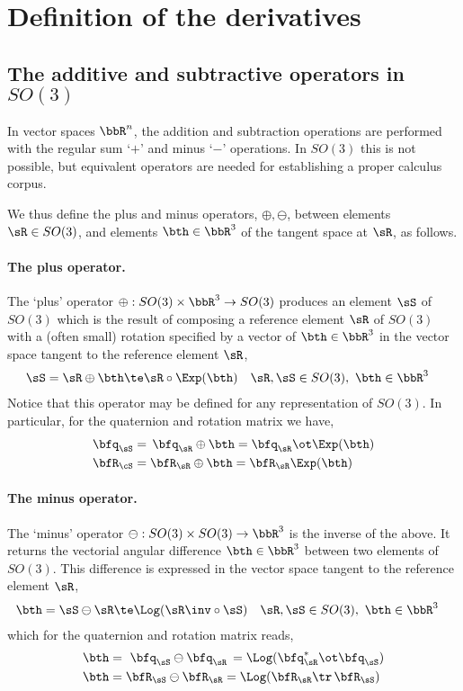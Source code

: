 
\appendix

\section{Definition of the derivatives }

\subsection{The additive and subtractive operators in $SO(3)$}

In vector spaces $\bbR^n$, the addition and subtraction operations are performed with the regular sum `$+$' and minus `$-$' operations.
In $SO(3)$ this is not possible, but equivalent operators are needed for establishing a proper calculus corpus. 

We thus define the plus and minus operators, $\oplus,\ominus$, between elements $\sR\in SO(3)$, and elements $\bth\in\bbR^3$ of the tangent space at $\sR$, as follows.

\paragraph{The plus operator.}
The `plus' operator $\oplus:SO(3)\times\bbR^3\to SO(3)$ produces an element $\sS$ of $SO(3)$ which is the result of composing a reference element $\sR$ of $SO(3)$ with a (often small) rotation specified by a vector of $\bth\in\bbR^3$ in the vector space tangent to the reference element $\sR$,
%
\begin{align}
\sS = \sR\oplus \bth &\te \sR\circ\Exp(\bth) && \sR,\sS\in SO(3),~ \bth\in\bbR^3 
\end{align}
%
Notice that this operator may be defined for any representation of $SO(3)$. In particular, for the quaternion and rotation matrix we have,
%
\begin{align}
\bfq_\sS &= \,\bfq_\sR\oplus\bth = \bfq_\sR\ot\Exp(\bth) \\
\bfR_\cS &= \bfR_\sR\oplus \bth = \bfR_\sR\Exp(\bth) 
\end{align}

\paragraph{The minus operator.}
The `minus' operator $\ominus:SO(3)\times SO(3)\to\bbR^3$ is the inverse of the above. It returns the vectorial angular difference $\bth\in\bbR^3$ between two elements of $SO(3)$. This difference is expressed in the  vector space tangent to the reference element $\sR$, 
%
\begin{align}
\bth=\sS\ominus \sR
&\te \Log(\sR\inv \circ \sS)     && \sR,\sS\in SO(3),~ \bth\in\bbR^3  
\end{align}
%
which for the quaternion and rotation matrix reads,
%
\begin{align}
\bth &= \,\,\bfq_\sS\ominus\bfq_\sR\, = \Log(\bfq_\sR^*\ot\bfq_\sS)                      \\
\bth &= \bfR_\sS\ominus\bfR_\sR = \Log(\bfR_\sR\tr\,\bfR_\sS)                         
\end{align}

